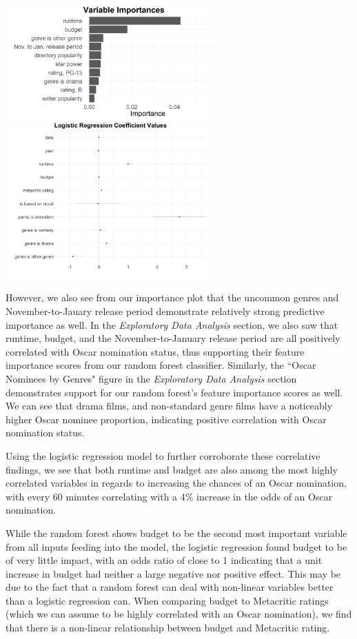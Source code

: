 \documentclass[10pt]{article}
\begin{document}
\begin{center}
\includegraphics[width=8cm]{_assets/predictive_analysis/variable_importance_rf_osc_nom.png}
\hspace{1cm}
\includegraphics[width=8cm]{_assets/log-reg-plots/dwplot.png}
\end{center}

However, we also see from our importance plot that the uncommon genres and November-to-Jauary release period demonstrate relatively strong predictive importance as well. In the \textit{Exploratory Data Analysis} section, we also saw that runtime, budget, and the November-to-January release period are all positively correlated with Oscar nomination status, thus supporting their feature importance scores from our random forest classifier. Similarly, the ``Oscar Nominees by Genres" figure in the \textit{Exploratory Data Analysis} section demonstrates support for our random forest’s feature importance scores as well. We can see that drama films, and non-standard genre films have a noticeably higher Oscar nominee proportion, indicating positive correlation with Oscar nomination status.

Using the logistic regression model to further corroborate these correlative findings, we see that both runtime and budget are also among the most highly correlated variables in regards to increasing the chances of an Oscar nomination, with every 60 minutes correlating with a 4\% increase in the odds of an Oscar nomination.

While the random forest shows budget to be the second most important variable from all inputs feeding into the model, the logistic regression found budget to be of very little impact, with an odds ratio of close to 1 indicating that a unit increase in budget had neither a large negative nor positive effect. This may be due to the fact that a random forest can deal with non-linear variables better than a logistic regression can. When comparing budget to Metacritic ratings (which we can assume to be highly correlated with an Oscar nomination), we find that there is a non-linear relationship between budget and Metacritic rating.
\end{document}
